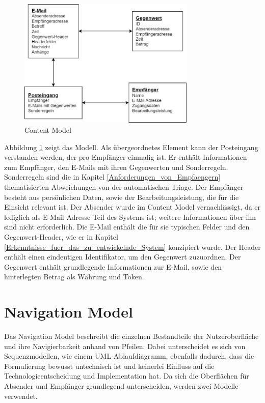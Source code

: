 \begin{figure}[!ht]
	\centering
		\includegraphics[width=0.75\textwidth]{Figures/Content Model.png}
	\caption{Content Model}
	\label{fig:content_model}
\end{figure}

\noindent Abbildung \ref{fig:content_model} zeigt das Modell. Als übergeordnetes Element kann der Posteingang verstanden werden, der pro Empfänger einmalig ist. Er enthält Informationen zum Empfänger, den E-Mails mit ihren Gegenwerten und Sonderregeln. Sonderregeln sind die in Kapitel \ref{Anforderungen_von_Empfaengern} thematisierten Abweichungen von der automatischen Triage. Der Empfänger besteht aus persönlichen Daten, sowie der Bearbeitungsleistung, die für die Einsicht relevant ist. Der Absender wurde im Content Model vernachlässigt, da er lediglich als E-Mail Adresse Teil des Systems ist; weitere Informationen über ihn sind nicht erforderlich. Die E-Mail enthält die für sie typischen Felder und den Gegenwert-Header, wie er in Kapitel \ref{Erkenntnisse_fuer_das_zu_entwickelnde_System} konzipiert wurde. Der Header enthält einen eindeutigen Identifikator, um den Gegenwert zuzuordnen. Der Gegenwert enthält grundlegende Informationen zur E-Mail, sowie den hinterlegten Betrag als Währung und Token.



\section{Navigation Model}
\label{Navigation_Model}

Das Navigation Model beschreibt die einzelnen Bestandteile der Nutzeroberfläche und ihre Navigierbarkeit anhand von Pfeilen. Dabei unterscheidet es sich von Sequenzmodellen, wie einem UML-Ablaufdiagramm, ebenfalls dadurch, dass die Formulierung bewusst untechnisch ist und keinerlei Einfluss auf die Technologieentscheidung und Implementation hat. Da sich die Oberflächen für Absender und Empfänger grundlegend unterscheiden, werden zwei Modelle verwendet.

